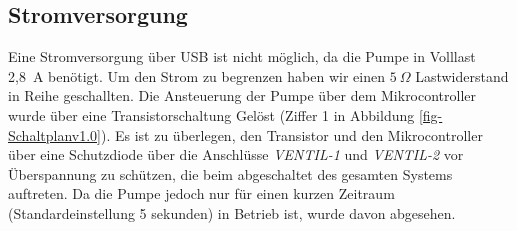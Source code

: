 \documentclass[]{IEEEtran}
\begin{document}
\subsection{Stromversorgung}
Eine Stromversorgung über USB ist nicht möglich, da die Pumpe in Volllast 2,8~A benötigt. Um den Strom zu begrenzen haben wir einen \begin{math}5~\Omega\end{math} Lastwiderstand in Reihe geschallten. Die Ansteuerung der Pumpe über dem Mikrocontroller wurde über eine Transistorschaltung Gelöst (Ziffer 1 in Abbildung \ref{fig-Schaltplanv1.0}). Es ist zu überlegen, den Transistor und den Mikrocontroller über eine Schutzdiode über die Anschlüsse \emph{VENTIL-1} und \emph{VENTIL-2} vor Überspannung zu schützen, die beim abgeschaltet des gesamten Systems auftreten. Da die Pumpe jedoch nur für einen kurzen Zeitraum (Standardeinstellung 5 sekunden) in Betrieb ist, wurde davon abgesehen. 
\end{document}
